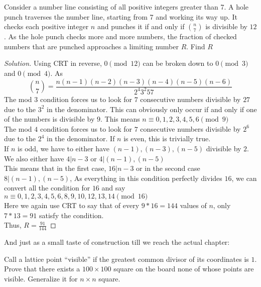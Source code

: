 \begin{example}
Consider a number line consisting of all positive integers greater than 7. A hole punch traverses the number line, starting from 7 and
working its way up. It checks each positive integer $n$ and punches it if and only if $\binom{n}{7}$ is divisible by $12$. As the hole punch checks more and more numbers, the fraction of checked numbers that are punched approaches a limiting number $R$. Find $R$
\end{example}
\begin{proof}
    [Solution]
    Using CRT in reverse, $0 \pmod{12}$ can be broken down to $0 \pmod{3}$ and $0 \pmod{4}$. As
    \[\binom{n}{7}=\frac{n(n-1)(n-2)(n-3)(n-4)(n-5)(n-6)}{2^4 3^2 5 7}\]
    The mod $3$ condition forces us to look for $7$ consecutive numbers divisible by $27$ due to the $3^2$ in the denominator. This can obviously only occur if and only if one of the numbers is divisible by $9$. This means $n \equiv 0,1,2,3,4,5,6 \pmod{9}$\\
    The mod $4$ condition forces us to look for $7$ consecutive numbers divisible by $2^6$ due to the $2^4$ in the denominator. If $n$ is even, this is trivially true.\\
    If $n$ is odd, we have to either have $(n-1),(n-3),(n-5)$ divisible by $2$. We also either have $4| n-3$  or $4| (n-1), (n-5)$\\
    This means that in the first case, $16| n-3$ or in the second case $8| (n-1), (n-5)$, As everything in this condition perfectly divides $16$, we can convert all the condition for $16$ and say $n \equiv 0, 1, 2, 3, 4, 5, 6, 8, 9, 10, 12, 13, 14 \pmod{16}$\\
    Here we again use CRT to say that of every $9*16=144$ values of $n$, only $7*13=91$ satisfy the condition.\\
    Thus, $R=\frac{91}{144}$
\end{proof}
And just as a small taste of construction till we reach the actual chapter:\\
\begin{example}
Call a lattice point “visible” if the greatest common divisor of its coordinates is $1$. Prove that there exists a $100 \times 100$ square on the board none of whose points are visible. Generalize it for $n \times n$ square.
\end{example}
